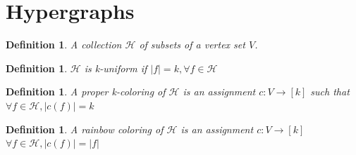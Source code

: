 \documentclass[a4paper]{article}
\newtheorem{defn}[thm]{Definition}
\begin{document}
\section{Hypergraphs}
\begin{defn}
A collection $\mathcal{H}$ of subsets of a vertex set $V$.
\end{defn}
\begin{defn}
    $\mathcal{H}$ is k-uniform if $|f|=k, \forall f\in \mathcal{H}$
\end{defn}
\begin{defn}
    A proper k-coloring of $\mathcal{H}$ is an assignment $c:V\to [k]$ such that $\forall f\in \mathcal{H}, |c(f)|=k$
\end{defn}
\begin{defn}
    A rainbow coloring of $\mathcal{H}$ is an assignment $c:V\to [k]$ $\forall f\in \mathcal{H}, |c(f)|=|f|$
\end{defn}
\end{document}
